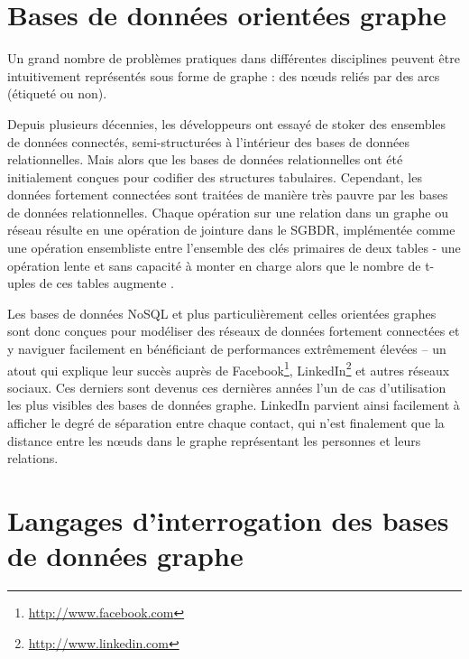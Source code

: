   
\section{Bases de données orientées graphe}
\label{sec:graph-database-overview}

Un grand nombre de problèmes pratiques dans différentes disciplines
peuvent être intuitivement représentés sous forme de graphe : des
nœuds reliés par des arcs (étiqueté ou non).

Depuis plusieurs décennies, les développeurs ont essayé de stoker des
ensembles de données connectés, semi-structurées à l'intérieur des
bases de données relationnelles. Mais alors que les bases de données
relationnelles ont été initialement conçues pour codifier des
structures tabulaires. Cependant, les données fortement connectées
sont traitées de manière très pauvre par les bases de données
relationnelles. Chaque opération sur une relation dans un graphe ou
réseau résulte en une opération de jointure dans le \acrshort{SGBDR},
implémentée comme une opération ensembliste entre l'ensemble des clés
primaires de deux tables - une opération lente et sans capacité à
monter en charge alors que le nombre de t-uples de ces tables augmente
\cite{robinson2013graph}.

Les bases de données NoSQL et plus particulièrement celles orientées
graphes sont donc conçues pour modéliser des réseaux de données
fortement connectées et y naviguer facilement en bénéficiant de
performances extrêmement élevées – un atout qui explique leur succès
auprès de Facebook\footnote{\url{http://www.facebook.com}},
LinkedIn\footnote{\url{http://www.linkedin.com}} et autres réseaux
sociaux. Ces derniers sont devenus ces dernières années l'un de cas
d'utilisation les plus visibles des bases de données graphe.  LinkedIn
parvient ainsi facilement à afficher le degré de séparation entre
chaque contact, qui n'est finalement que la distance entre les nœuds
dans le graphe représentant les personnes et leurs relations.

\section{Langages d'interrogation des bases de données graphe}
\label{query-languages}

